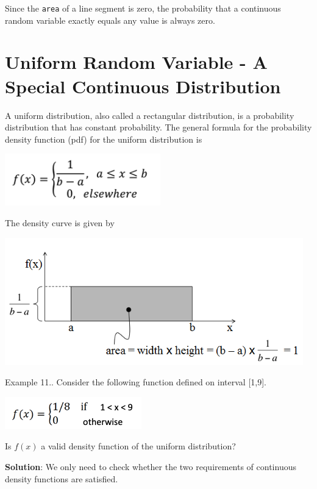 \documentclass[
]{book}
\begin{document}
Since the \texttt{area} of a line segment is zero, the probability that a continuous random variable exactly equals any value is always zero.

\hypertarget{uniform-random-variable---a-special-continuous-distribution}{%
\section{Uniform Random Variable - A Special Continuous Distribution}\label{uniform-random-variable---a-special-continuous-distribution}}

A uniform distribution, also called a rectangular distribution, is a probability distribution that has constant probability. The general formula for the probability density function (pdf) for the uniform distribution is

\begin{center}\includegraphics[width=0.3\linewidth]{week03/uniformDensityFun} \end{center}

The density curve is given by

\begin{center}\includegraphics[width=0.55\linewidth]{week03/uniformDensityCurve} \end{center}

Example 11.. Consider the following function defined on interval {[}1,9{]}.

\begin{center}\includegraphics[width=0.3\linewidth]{week03/uniformExample01} \end{center}

Is \(f(x)\) a valid density function of the uniform distribution?

\textbf{Solution}: We only need to check whether the two requirements of continuous density functions are satisfied.
\end{document}

